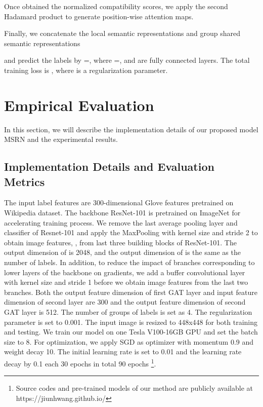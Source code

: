\documentclass{article} \usepackage{nips14submit_e,times}
\begin{document}
Once obtained the normalized compatibility scores,
we apply the second Hadamard product to generate position-wise attention maps.



Finally, we concatenate the local semantic representations 
and group shared semantic representations

and predict the labels
by =, where =,  and  are fully connected layers.
The total training loss is ,
where  is a regularization parameter.


\section{Empirical Evaluation}
\label{sec:experiment}
In this section, we will describe the implementation details of our proposed model MSRN and the experimental results.

\subsection{Implementation Details and Evaluation Metrics}
The input label features  are 300-dimensional Glove features pretrained on Wikipedia dataset.
The backbone ResNet-101 is pretrained on ImageNet for accelerating
training process. We remove the last average pooling layer and classifier of Resnet-101
and apply the MaxPooling with kernel size  and stride 2 to obtain image features, ,
from last three building blocks of ResNet-101. The output dimension of  is 2048, and the output dimension of  is the same as the number of labels. In addition, to reduce the impact of branches
corresponding to lower layers of the backbone on gradients, we add a buffer convolutional layer \cite{ECCV2016:UMDC}
with kernel size  and stride 1 before we obtain image features from the last two branches.
Both the output feature dimension of first GAT layer and input feature dimension of second
layer are 300 and the output feature dimension of second GAT layer is 512. The number of groups of labels  is set as 4. The regularization parameter  is set to 0.001.
The input image is resized to 448x448 for both training and testing.
We train our model on one Tesla V100-16GB GPU and set the batch size to 8.
For optimization, we apply SGD as optimizer with momentum 0.9 and weight decay 10.
The initial learning rate is set to 0.01 and the learning rate decay by 0.1 each 30 epochs in total 90 epochs \footnote{Source codes and pre-trained models of our method are publicly available at https://jiunhwang.github.io/}.
\end{document}
